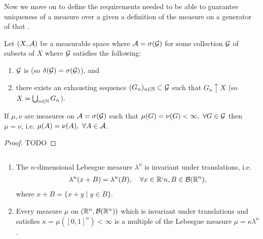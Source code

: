 Now we move on to define the requirements needed to be able to guarantee uniqueness of a measure over a \siga given a definition of the measure on a generator of that \siga.

\begin{thm}
	Let $(X, \mathcal{A})$ be a measurable space where $\mathcal{A} = \sigma(\mathcal{G})$ for some collection $\mathcal{G}$ of subsets of $X$ where $\mathcal{G}$ satisfies the following:
	\begin{enumerate}
		\item $\mathcal{G}$ is \istable (so $\delta(\mathcal{G}) = \sigma(\mathcal{G})$), and
		\item there exists an exhausting sequence $(G_n)_{n \in \mathbb{N}} \subset \mathcal{G}$ such that $G_n\uparrow X$ (so $X = \bigcup_{n\in\mathbb{N}}G_n$). 
	\end{enumerate}

	If $\mu, \nu$ are measures on $\mathcal{A} = \sigma(\mathcal{G})$ such that $\mu(G) = \nu(G) < \infty,\ \forall G \in \calG$ then $\mu = \nu$, i.e. $\mu(A) = \nu(A),\ \forall A \in \mathcal{A}$.
\end{thm}

\begin{proof}
	TODO
\end{proof}

\begin{thm}$ $\newline
	\begin{enumerate}
		\item The $n$-dimensional Lebesgue measure $\lambda^n$ is invariant under translations, i.e.
		\begin{align*}
			\lambda^n(x + B) = \lambda^n(B),\quad \forall x \in \mathbb{R}`n, B \in \mathcal{B}(\mathbb{R}^n),
		\end{align*}
		where $x + B = \{x + y \mid y \in B\}$.
		
		\item Every measure $\mu$ on $(\mathbb{R}^n, \mathcal{B}(\mathbb{R}^n))$ which is invariant under translations and satisfies $\kappa = \mu([0,1]^n) < \infty$ is a multiple of the Lebesgue measure $\mu = \kappa \lambda^n$.
	\end{enumerate}
\end{thm}

